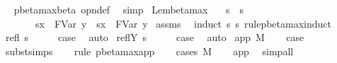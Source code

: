 \begin{isabellebody}
\isadelimproof
\ %
\endisadelimproof
%
\isatagproof
{}\isamarkupfalse%
\ pbeta{\isacharunderscore}max{\isachardot}beta\ opn{\isacharprime}{\isacharunderscore}def\ \isamarkupfalse%
\ simp%
\endisatagproof
{\isafoldproof}%
%
\isadelimproof
%
\endisadelimproof
\isanewline
\isanewline
{}\isamarkupfalse%
\ Lem{}{\isacharunderscore}{}{\isacharunderscore}{}{\isacharunderscore}beta{\isacharunderscore}max{\isacharcolon}\isanewline
\ \ \ {\isachardoublequoteopen}s\ {\isachargreater}{\isachargreater}{\isachargreater}\ s{\isacharprime}{\isachardoublequoteclose}\isanewline
\ \ \ \ \ \ \ {\isachardoublequoteopen}{\isacharparenleft}s{\isacharbrackleft}x\ {\isacharcolon}{\isacharcolon}{\isacharequal}\ FVar\ y{\isacharbrackright}{\isacharparenright}\ {\isachargreater}{\isachargreater}{\isachargreater}\ {\isacharparenleft}s{\isacharprime}{\isacharbrackleft}x\ {\isacharcolon}{\isacharcolon}{\isacharequal}\ FVar\ y{\isacharbrackright}{\isacharparenright}{\isachardoublequoteclose}\isanewline
%
\isadelimproof
%
\endisadelimproof
%
\isatagproof
{}\isamarkupfalse%
\ assms\ \isamarkupfalse%
\ {\isacharparenleft}induct\ s\ s{\isacharprime}\ rule{\isacharcolon}pbeta{\isacharunderscore}max{\isachardot}induct{\isacharparenright}\isanewline
{}\isamarkupfalse%
\ {\isacharparenleft}refl\ s{\isacharparenright}\isanewline
\ \ \isamarkupfalse%
\ \isamarkupfalse%
\ {\isacharquery}case\ \isamarkupfalse%
\ auto\isanewline
{}\isamarkupfalse%
\isanewline
{}\isamarkupfalse%
\ {\isacharparenleft}reflY\ s{\isacharparenright}\isanewline
\ \ \isamarkupfalse%
\ \isamarkupfalse%
\ {\isacharquery}case\ \isamarkupfalse%
\ auto\isanewline
{}\isamarkupfalse%
\isanewline
{}\isamarkupfalse%
\ {\isacharparenleft}app\ M{\isacharparenright}\isanewline
\ \ \isamarkupfalse%
\ {\isacharquery}case\ \isanewline
\ \ \isamarkupfalse%
\ subst{\isachardot}simps\isanewline
\ \ \isamarkupfalse%
\ {\isacharparenleft}rule\ pbeta{\isacharunderscore}max{\isachardot}app{\isacharparenright}\isanewline
\ \ \isamarkupfalse%
\ {\isacharparenleft}cases\ M{\isacharparenright}\isanewline
\ \ \isamarkupfalse%
\ app\ \isamarkupfalse%
\ simp{\isacharunderscore}all\isanewline
\ \ \isamarkupfalse%

\end{isabellebody}
